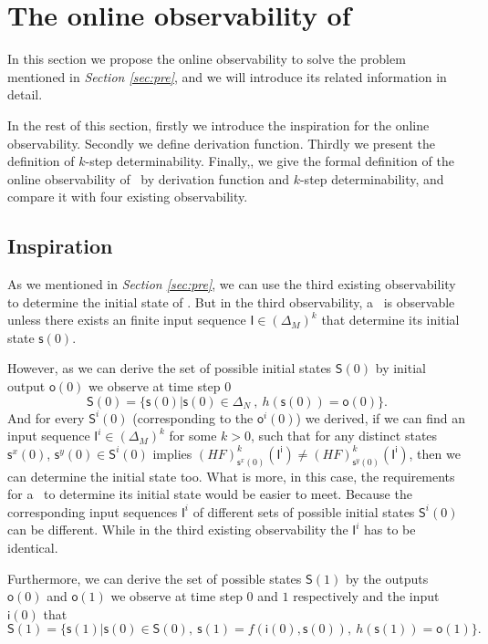 \section{The online observability of \BCNs}
\label{sec:online}

In this section we propose the online observability to solve the problem mentioned in {\em Section \ref{sec:pre}}, and we will introduce its related information in detail. 

In the rest of this section, firstly we introduce the inspiration for the online observability. Secondly we define derivation function. Thirdly we present the definition of $k$-step determinability. Finally,, we give the formal definition of the online observability of \BCNs\ by derivation function and $k$-step determinability, and compare it with four existing observability.

\subsection{Inspiration}


As we mentioned in {\em Section \ref{sec:pre}}, we can use the third existing observability to determine the initial state of \BCN. But in the third observability, a \BCN\ is observable unless there exists an finite input sequence $\mathsf{I}\in(\Delta_M)^k$ that determine its initial state $\mathsf{s}(0)$. 

However, as we can derive the set of possible initial states $\mathsf{S}(0)$ by initial output $\mathsf{o}(0)$ we observe at time step $0$ 
\[\mathsf{S}(0)=\{\mathsf{s}(0)|\mathsf{s}(0)\in \Delta_N\ ,\ h( \mathsf{s}(0))=\mathsf{o}(0)\}.\]
And for every $\mathsf{S}^{i}(0)$ (corresponding to the $\mathsf{o}^{i}(0)$) we derived, if we can find an input sequence $\mathsf{I}^{i}\in(\Delta_M)^k$ for some $k>0$, such that for any distinct states $\mathsf{s}^{x}(0)$, $\mathsf{s}^{y}(0) \in \mathsf{S}^{i}(0)$ implies $(HF)^k_{\mathsf{s}^{x}(0)}(\mathsf{I^i})\neq (HF)^k_{\mathsf{s}^{y}(0)}(\mathsf{I^i})$,
then we can determine the initial state too. 
What is more, in this case, the requirements for a \BCN\ to determine its initial state would be easier to meet. Because the corresponding input sequences $\mathsf{I}^{i}$ of different sets of possible initial states $\mathsf{S}^{i}(0)$ can be different. While in the third existing observability the $\mathsf{I}^{i}$ has to be identical.

Furthermore, we can derive the set of possible states $\mathsf{S}(1)$ by the outputs $\mathsf{o}(0)$ and $\mathsf{o}(1)$ we observe at time step $0$ and $1$ respectively and the input $\mathsf{i}(0)$ that
\[\mathsf{S}(1)=\{\mathsf{s}(1)|\mathsf{s}(0)\in \mathsf{S}(0),\ \mathsf{s}(1)=f({\mathsf{i}(0)},{\mathsf{s}(0)}),\ h(\mathsf{s}(1))=\mathsf{o}(1)\}.\]

